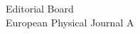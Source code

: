 \documentclass{letter} %
\begin{document}
\begin{letter}{
Editorial Board \\
European Physical Journal A}









\end{letter}
\end{document}

